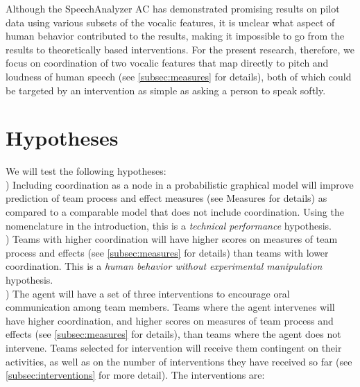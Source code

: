 Although the SpeechAnalyzer AC has demonstrated promising results on pilot data
using various subsets of the vocalic features, it is unclear what aspect of
human behavior contributed to the results, making it impossible to go from the
results to theoretically based interventions. For the present research,
therefore, we focus on coordination of two vocalic features that map directly
to pitch and loudness of human speech (see \autoref{subsec:measures} for
details), both of which could be targeted by an intervention as simple as
asking a person to speak softly. 


\section{Hypotheses}

We will test the following hypotheses:\\

) Including coordination as a node in a probabilistic graphical
model will improve prediction of team process and effect measures (see Measures
for details)  as compared to a comparable model that does not include
coordination. Using the nomenclature in the introduction, this is a
\textit{technical performance} hypothesis.\\

) Teams with higher coordination will have higher scores on measures
of team process and effects (see \autoref{subsec:measures} for details) than
teams with lower coordination. This is a
\textit{human behavior without experimental manipulation} hypothesis. \\

) The agent will have a set of three interventions to encourage oral
communication among team members. Teams where the agent intervenes will have
higher coordination, and higher scores on measures of team process and effects
(see \autoref{subsec:measures} for details), than teams where the agent does
not intervene.  Teams selected for intervention will receive them contingent on
their activities, as well as on the number of interventions they have received
so far (see \autoref{subsec:interventions} for more detail).  The interventions
are:

